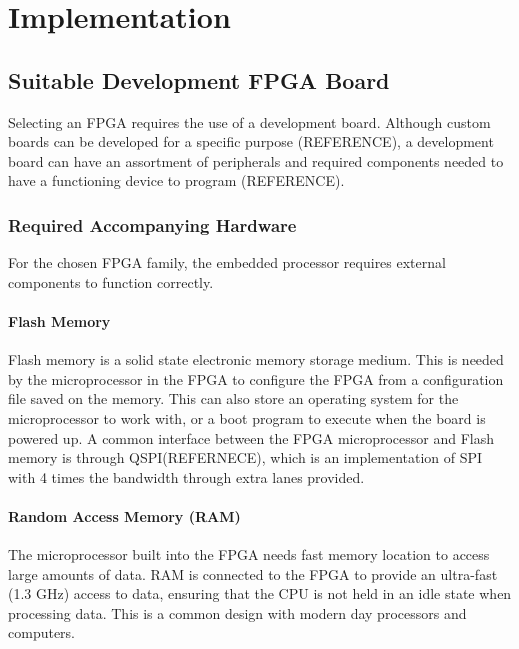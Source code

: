 \chapter{Implementation}\label{C:impl}

\section{Suitable Development FPGA Board}

\par Selecting an FPGA requires the use of a development board. Although custom boards can be developed for a 
specific purpose (REFERENCE), a development board can have an assortment of peripherals and required components needed to 
have a functioning device to program (REFERENCE). 

\subsection{Required Accompanying Hardware}

\par For the chosen FPGA family, the embedded processor requires external components to function correctly.

\subsubsection{Flash Memory}

\par Flash memory is a solid state electronic memory storage medium. This is needed by the microprocessor in 
the FPGA to configure the FPGA from a configuration file saved on the memory. This can also store an operating 
system for the microprocessor to work with, or a boot program to execute when the board is powered up. A common 
interface between the FPGA microprocessor and Flash memory is through QSPI(REFERNECE), which is an implementation of SPI with 
4 times the bandwidth through extra lanes provided. 

\subsubsection{Random Access Memory (RAM)}

\par The microprocessor built into the FPGA needs fast memory location to access large amounts of data. RAM is 
connected to the FPGA to provide an ultra-fast (1.3 GHz) access to data, ensuring that the CPU is not held in an 
idle state when processing data. This is a common design with modern day processors and computers.

